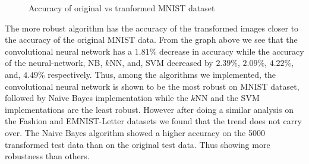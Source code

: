 \begin{figure}[H]
\caption{Accuracy of original vs tranformed MNIST dataset}
\label{img:transformedaccuracy}
\end{figure}

The more robust algorithm has the accuracy of the transformed images closer to the accuracy of the original MNIST data. From the graph above we see that the convolutional neural network has a $1.81\%$ decrease in accuracy while the accuracy of the neural-network, NB, $k$NN, and, SVM decreased by $2.39\%$, $2.09\%$, $4.22\%$, and, $4.49\%$ respectively. Thus, among the algorithms we implemented, the convolutional neural network is shown to be the most robust on MNIST dataset, followed by Naive Bayes implementation while the $k$NN and the SVM implementations are the least robust. However after doing a similar analysis on the Fashion and EMNIST-Letter datasets we found that the trend does not carry over. The Naive Bayes algorithm showed a higher accuracy on the 5000 transformed test data than on the original test data. Thus showing more robustness than others.

